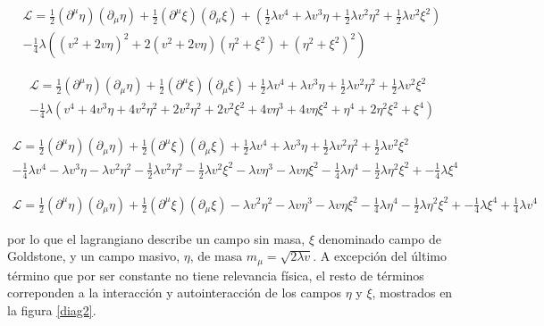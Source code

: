 \begin{multline}
 \mathcal{L} = \frac{1}{2} (\partial^{\mu}\eta)(\partial_{\mu}\eta) + \frac{1}{2} (\partial^{\mu}\xi)(\partial_{\mu}\xi) + \left(\frac{1}{2}\lambda v^4 + \lambda v^3\eta + \frac{1}{2}\lambda v^2\eta^2 +\frac{1}{2}\lambda v^2\xi^2\right)\\
- \frac{1}{4}\lambda \left((v^2 + 2v\eta)^2 + 2(v^2 + 2v\eta)(\eta^2+\xi^2) + (\eta^2+\xi^2)^2 \right)
\end{multline}

\begin{multline}
 \mathcal{L} = \frac{1}{2} (\partial^{\mu}\eta)(\partial_{\mu}\eta) + \frac{1}{2} (\partial^{\mu}\xi)(\partial_{\mu}\xi) + \frac{1}{2}\lambda v^4 + \lambda v^3\eta + \frac{1}{2}\lambda v^2\eta^2 +\frac{1}{2}\lambda v^2\xi^2\\
- \frac{1}{4}\lambda \left(v^4 + 4v^3\eta + 4v^2\eta^2 + 2v^2\eta^2 + 2v^2\xi^2 + 4v\eta^3 + 4v\eta\xi^2 + \eta^4 + 2\eta^2\xi^2 + \xi^4 \right)
\end{multline}

\begin{multline}
 \mathcal{L} = \frac{1}{2} (\partial^{\mu}\eta)(\partial_{\mu}\eta) + \frac{1}{2} (\partial^{\mu}\xi)(\partial_{\mu}\xi) + \frac{1}{2}\lambda v^4 + \lambda v^3\eta + \frac{1}{2}\lambda v^2\eta^2 +\frac{1}{2}\lambda v^2\xi^2\\
- \frac{1}{4}\lambda v^4 - \lambda v^3\eta - \lambda v^2\eta^2 - \frac{1}{2}\lambda v^2\eta^2  - \frac{1}{2}\lambda v^2\xi^2 - \lambda v\eta^3 - \lambda v\eta\xi^2 - \frac{1}{4}\lambda\eta^4 - \frac{1}{2}\lambda\eta^2\xi^2 + - \frac{1}{4}\lambda\xi^4 
\end{multline}

\begin{multline}
 \mathcal{L} = \frac{1}{2} (\partial^{\mu}\eta)(\partial_{\mu}\eta) + \frac{1}{2} (\partial^{\mu}\xi)(\partial_{\mu}\xi) - \lambda v^2\eta^2 - \lambda v\eta^3 - \lambda v\eta\xi^2 - \frac{1}{4}\lambda\eta^4 - \frac{1}{2}\lambda\eta^2\xi^2 + - \frac{1}{4}\lambda\xi^4 + \frac{1}{4}\lambda v^4
 \label{rs2}
\end{multline}

por lo que el lagrangiano describe un campo sin masa, $\xi$ denominado campo de Goldstone, y un campo masivo, $\eta$, de masa $m_{\mu}=\sqrt{2\lambda v}$. A excepción del último término que por ser constante no tiene relevancia física, el resto de términos correponden a la interacción y autointeracción de los campos $\eta$ y $\xi$, mostrados en la figura \ref{diag2}.

